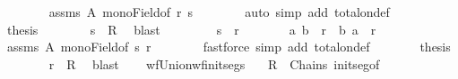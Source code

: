 \begin{isabellebody}
\ \ \ \ \ \ \isamarkupfalse%
\ assms{\isacharparenleft}{\kern0pt}{}{\isacharparenright}{\kern0pt}\ A\ mono{\isacharunderscore}{\kern0pt}Field{\isacharbrackleft}{\kern0pt}of\ r\ s{\isacharbrackright}{\kern0pt}\isanewline
\ \ \ \ \ \ \isamarkupfalse%
\ {\isacharparenleft}{\kern0pt}auto\ simp\ add{\isacharcolon}{\kern0pt}\ total{\isacharunderscore}{\kern0pt}on{\isacharunderscore}{\kern0pt}def{\isacharparenright}{\kern0pt}\isanewline
\ \ \ \ \isamarkupfalse%
\ \isamarkupfalse%
\ {\isacharquery}{\kern0pt}thesis\isanewline
\ \ \ \ \ \ \isamarkupfalse%
\ {\isacartoucheopen}s\ {\isasymin}\ R{\isacartoucheclose}\ \isamarkupfalse%
\ blast\isanewline
\ \ \isamarkupfalse%
\isanewline
\ \ \ \ \isamarkupfalse%
\ {\isachardoublequoteopen}s\ {\isasymsubseteq}\ r{\isachardoublequoteclose}\isanewline
\ \ \ \ \isamarkupfalse%
\ \isamarkupfalse%
\ {\isachardoublequoteopen}{\isacharparenleft}{\kern0pt}a{\isacharcomma}{\kern0pt}\ b{\isacharparenright}{\kern0pt}\ {\isasymin}\ r\ {\isasymor}\ {\isacharparenleft}{\kern0pt}b{\isacharcomma}{\kern0pt}\ a{\isacharparenright}{\kern0pt}\ {\isasymin}\ r{\isachardoublequoteclose}\isanewline
\ \ \ \ \ \ \isamarkupfalse%
\ assms{\isacharparenleft}{\kern0pt}{}{\isacharparenright}{\kern0pt}\ A\ mono{\isacharunderscore}{\kern0pt}Field{\isacharbrackleft}{\kern0pt}of\ s\ r{\isacharbrackright}{\kern0pt}\isanewline
\ \ \ \ \ \ \isamarkupfalse%
\ {\isacharparenleft}{\kern0pt}fastforce\ simp\ add{\isacharcolon}{\kern0pt}\ total{\isacharunderscore}{\kern0pt}on{\isacharunderscore}{\kern0pt}def{\isacharparenright}{\kern0pt}\isanewline
\ \ \ \ \isamarkupfalse%
\ \isamarkupfalse%
\ {\isacharquery}{\kern0pt}thesis\isanewline
\ \ \ \ \ \ \isamarkupfalse%
\ {\isacartoucheopen}r\ {\isasymin}\ R{\isacartoucheclose}\ \isamarkupfalse%
\ blast\isanewline
\ \ \isamarkupfalse%
\isanewline
{}\isamarkupfalse%
%
\endisatagproof
{\isafoldproof}%
%
\isadelimproof
\isanewline
%
\endisadelimproof
\isanewline
{}\isamarkupfalse%
\ wf{\isacharunderscore}{\kern0pt}Union{\isacharunderscore}{\kern0pt}wf{\isacharunderscore}{\kern0pt}init{\isacharunderscore}{\kern0pt}segs{\isacharcolon}{\kern0pt}\isanewline
\ \ \ {\isachardoublequoteopen}R\ {\isasymin}\ Chains\ init{\isacharunderscore}{\kern0pt}seg{\isacharunderscore}{\kern0pt}of{\isachardoublequoteclose}\isanewline

\end{isabellebody}
